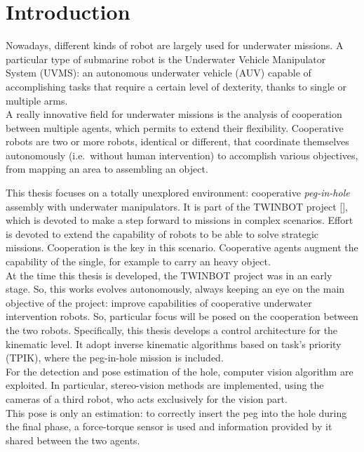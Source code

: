 

\chapter{Introduction}
\label{chap:introduction}
\ifpdf
    \graphicspath{{Introduction/Figures/PNG/}{Introduction/Figures/PDF/}{Introduction/Figures/}}
\else
    \graphicspath{{Introduction/Figures/EPS/}{Introduction/Figures/}}
\fi

Nowadays, different kinds of robot are largely used for underwater missions. A particular type of submarine robot is the Underwater Vehicle Manipulator System (UVMS): an autonomous underwater vehicle (AUV) capable of accomplishing tasks that require a certain level of dexterity, thanks to single or multiple arms.\\
A really innovative field for underwater missions is the analysis of cooperation between multiple agents, which permits to extend their flexibility. Cooperative robots are two or more robots, identical or different, that coordinate themselves autonomously (i.e.\ without human intervention) to accomplish various objectives, from mapping an area to assembling an object.   

This thesis focuses on a totally unexplored environment: cooperative \textit{peg-in-hole} assembly with underwater manipulators. It is part of the TWINBOT project [\cite{TWINBOT2019}], which is devoted to make a step forward to missions in complex scenarios. Effort is devoted to extend the capability of robots to be able to solve strategic missions. Cooperation is the key in this scenario. Cooperative agents augment the capability of the single, for example to carry an heavy object.\\

At the time this thesis is developed, the TWINBOT project was in an early stage. So, this works evolves autonomously, always keeping an eye on the main objective of the project: improve capabilities of cooperative underwater intervention robots.
So, particular focus will be posed on the cooperation between the two robots. Specifically, this thesis develops a control architecture for the kinematic level. It adopt inverse kinematic algorithms based on task's priority (TPIK), where the peg-in-hole mission is included.\\
For the detection and pose estimation of the hole, computer vision algorithm are exploited. In particular, stereo-vision methods are implemented, using the cameras of a third robot, who acts exclusively for the vision part.\\ 
This pose is only an estimation: to correctly insert the peg into the hole during the final phase, a force-torque sensor is used and information provided by it shared between the two agents.\\

